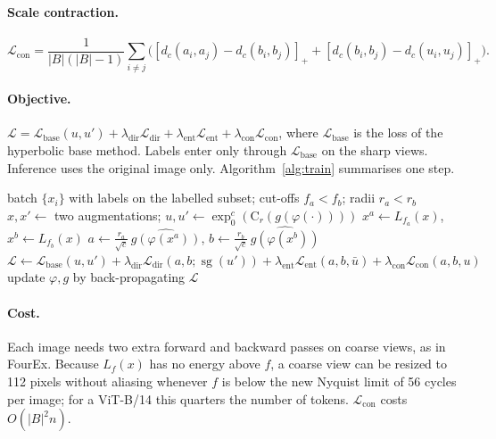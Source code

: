 \documentclass[10pt]{article}
\DeclareMathOperator{\sg}{sg}
\newcommand{\Lb}{\mathcal{L}}
\begin{document}
\paragraph{Scale contraction.}
\begin{equation}
\Lb_{\mathrm{con}}=\frac{1}{|B|(|B|-1)}\sum_{i\neq j}\Big([d_c(a_i,a_j)-d_c(b_i,b_j)]_+ + [d_c(b_i,b_j)-d_c(u_i,u_j)]_+\Big).
\end{equation}

\paragraph{Objective.} $\Lb=\Lb_{\mathrm{base}}(u,u')+\lambda_{\mathrm{dir}}\Lb_{\mathrm{dir}}
+\lambda_{\mathrm{ent}}\Lb_{\mathrm{ent}}+\lambda_{\mathrm{con}}\Lb_{\mathrm{con}}$, where
$\Lb_{\mathrm{base}}$ is the loss of the hyperbolic base method. Labels enter only through
$\Lb_{\mathrm{base}}$ on the sharp views. Inference uses the original image only. Algorithm~\ref{alg:train}
summarises one step.

\begin{algorithm}[t]
\caption{One FreqCone training step (added to a hyperbolic GCD base method).}\label{alg:train}
\begin{algorithmic}[1]
\Require batch $\{x_i\}$ with labels on the labelled subset; cut-offs $f_a<f_b$; radii $r_a<r_b$
\State $x,x'\gets$ two augmentations; $u,u'\gets\exp_0^c(\mathrm{C}_r(g(\varphi(\cdot))))$ 
\State $x^a\gets L_{f_a}(x)$, $x^b\gets L_{f_b}(x)$
\State $a\gets \tfrac{r_a}{\sqrt c}\,\widehat{g(\varphi(x^a))}$, $b\gets \tfrac{r_b}{\sqrt c}\,\widehat{g(\varphi(x^b))}$ 
\State $\Lb\gets\Lb_{\mathrm{base}}(u,u')+\lambda_{\mathrm{dir}}\Lb_{\mathrm{dir}}(a,b;\sg(u'))
+\lambda_{\mathrm{ent}}\Lb_{\mathrm{ent}}(a,b,\bar u)+\lambda_{\mathrm{con}}\Lb_{\mathrm{con}}(a,b,u)$
\State update $\varphi,g$ by back-propagating $\Lb$
\end{algorithmic}
\end{algorithm}

\paragraph{Cost.} Each image needs two extra forward and backward passes on coarse views, as in FourEx.
Because $L_f(x)$ has no energy above $f$, a coarse view can be resized to 112 pixels without aliasing whenever
$f$ is below the new Nyquist limit of 56 cycles per image; for a ViT-B/14 this quarters the number of tokens.
$\Lb_{\mathrm{con}}$ costs $O(|B|^2 n)$.
\end{document}
